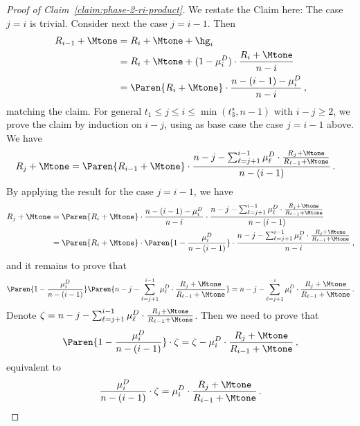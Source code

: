 \begin{proof}[Proof of Claim~\ref{claim:phase-2-ri-product}]
    We restate the Claim here:
    \claimphasetworiproduct*
    The case $j = i$ is trivial. Consider next the case $j = i - 1$. Then
    \begin{align*}
    R_{i-1} + \Mtone
    &= R_i + \Mtone + \hg_i\\
    &= R_i + \Mtone + (1 - \mu_i^D) \cdot \frac{R_i + \Mtone}{n - i}\\
    &= \Paren{R_i + \Mtone} \cdot \frac{n - (i - 1) - \mu_i^D}{n - i}\,,
    \end{align*}
    matching the claim. For general $t_1 \leq j \leq i \leq \min(t_3^\star, n-1)$ with $i - j \geq 2$, we prove the claim by induction on $i - j$, using as base case the case $j=i-1$ above. We have
    \begin{align*}
    R_{j} + \Mtone
    &= \Paren{R_{i - 1} + \Mtone} \cdot \frac{n - j - \sum_{\ell = j + 1}^{i - 1} \mu_{\ell}^D \cdot \frac{R_j + \Mtone}{R_{\ell - 1} + \Mtone}}{n - (i - 1)}\,.
    \end{align*}
    By applying the result for the case $j = i-1$, we have
    \begin{align*}
    R_{j} + \Mtone
    &= \Paren{R_{i} + \Mtone} \cdot \frac{n - (i - 1) - \mu_i^D}{n - i} \cdot \frac{n - j - \sum_{\ell = j + 1}^{i - 1} \mu_{\ell}^D \cdot \frac{R_j + \Mtone}{R_{\ell - 1} + \Mtone}}{n - (i - 1)}\\
    &= \Paren{R_{i} + \Mtone} \cdot \Paren{1 - \frac{\mu_i^D}{n - (i - 1)}} \cdot \frac{n - j - \sum_{\ell = j + 1}^{i - 1} \mu_{\ell}^D \cdot \frac{R_j + \Mtone}{R_{\ell - 1} + \Mtone}}{n - i}\,,
    \end{align*}
    and it remains to prove that
    \begin{equation*}\Paren{1 - \frac{\mu_i^D}{n - (i - 1)}} \Paren{n - j - \sum_{\ell = j + 1}^{i - 1} \mu_{\ell}^D \cdot \frac{R_j + \Mtone}{R_{\ell - 1} + \Mtone}} = n - j - \sum_{\ell = j + 1}^{i} \mu_{\ell}^D \cdot \frac{R_j + \Mtone}{R_{\ell - 1} + \Mtone}\,.\end{equation*}
    Denote $\zeta = n - j - \sum_{\ell = j + 1}^{i-1} \mu_{\ell}^D \cdot \frac{R_j + \Mtone}{R_{\ell - 1} + \Mtone}$. Then we need to prove that
    \begin{equation*}\Paren{1 - \frac{\mu_i^D}{n - (i - 1)}} \cdot \zeta = \zeta - \mu_i^D \cdot \frac{R_j + \Mtone}{R_{i - 1} + \Mtone}\,,\end{equation*}
    equivalent to
    \begin{equation*}\frac{\mu_i^D}{n - (i - 1)} \cdot \zeta = \mu_i^D \cdot \frac{R_j + \Mtone}{R_{i - 1} + \Mtone}\,.\end{equation*}

\end{proof}
